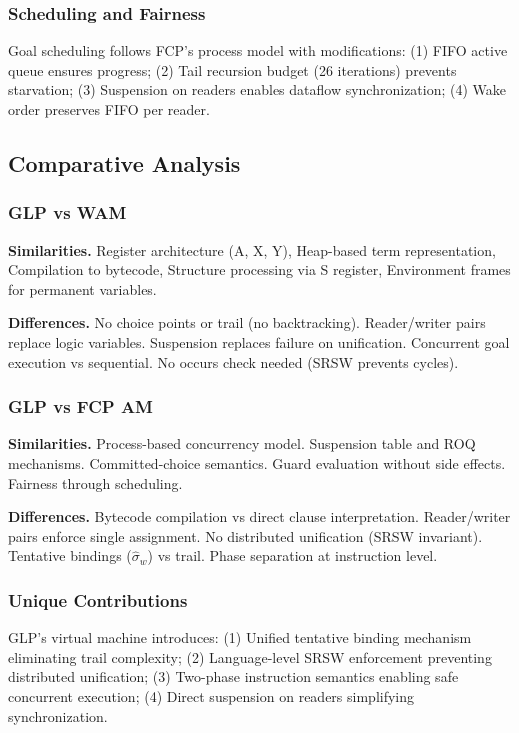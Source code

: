 \documentclass[runningheads,thm-restate]{llncs}
\newcommand{\mypara}[1]{\smallskip\noindent\textbf{#1.}}
\begin{document}
\subsubsection{Scheduling and Fairness}

Goal scheduling follows FCP's process model with modifications: (1) FIFO active queue ensures progress; (2) Tail recursion budget (26 iterations) prevents starvation; (3) Suspension on readers enables dataflow synchronization; (4) Wake order preserves FIFO per reader.

\subsection{Comparative Analysis}

\subsubsection{GLP vs WAM}

\mypara{Similarities}
Register architecture (A, X, Y), Heap-based term representation, Compilation to bytecode, Structure processing via S register, Environment frames for permanent variables.

\mypara{Differences}
No choice points or trail (no backtracking). Reader/writer pairs replace logic variables. Suspension replaces failure on unification. Concurrent goal execution vs sequential. No occurs check needed (SRSW prevents cycles).

\subsubsection{GLP vs FCP AM}

\mypara{Similarities}
Process-based concurrency model. Suspension table and ROQ mechanisms. Committed-choice semantics. Guard evaluation without side effects. Fairness through scheduling.

\mypara{Differences}
Bytecode compilation vs direct clause interpretation. Reader/writer pairs enforce single assignment. No distributed unification (SRSW invariant). Tentative bindings ($\hat{\sigma}_w$) vs trail. Phase separation at instruction level.

\subsubsection{Unique Contributions}

GLP's virtual machine introduces: (1) Unified tentative binding mechanism eliminating trail complexity; (2) Language-level SRSW enforcement preventing distributed unification; (3) Two-phase instruction semantics enabling safe concurrent execution; (4) Direct suspension on readers simplifying synchronization.
\end{document}
